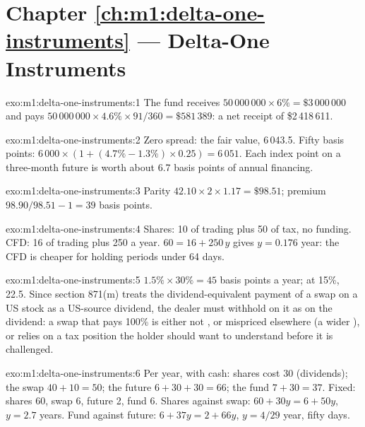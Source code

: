 \section*{Chapter \ref{ch:m1:delta-one-instruments} --- Delta-One Instruments}

\begin{solution}{exo:m1:delta-one-instruments:1}
The fund receives $50\,000\,000 \times 6\% = \$3\,000\,000$ and pays
$50\,000\,000 \times 4.6\% \times 91/360 = \$581\,389$: a net receipt of
\$2\,418\,611.
\end{solution}

\begin{solution}{exo:m1:delta-one-instruments:2}
Zero spread: the fair value, 6\,043.5. Fifty basis points: $6\,000 \times (1 +
(4.7\% - 1.3\%) \times 0.25) = 6\,051$. Each index point on a three-month
future is worth about 6.7 basis points of annual financing.
\end{solution}

\begin{solution}{exo:m1:delta-one-instruments:3}
Parity $42.10 \times 2 \times 1.17 = \$98.51$; premium $98.90/98.51 - 1 = 39$
basis points.
\end{solution}

\begin{solution}{exo:m1:delta-one-instruments:4}
Shares: 10 of trading plus 50 of tax, no funding. CFD: 16 of trading plus 250
a year. $60 = 16 + 250\,y$ gives $y = 0.176$ year: the CFD is cheaper for
holding periods under 64 days.
\end{solution}

\begin{solution}{exo:m1:delta-one-instruments:5}
$1.5\% \times 30\% = 45$ basis points a year; at 15\%, 22.5. Since section
871(m) treats the dividend-equivalent payment of a  swap on a US
stock as a US-source dividend, the dealer must withhold on it as on the
dividend: a swap that pays 100\% is either not , or mispriced
elsewhere (a wider ), or relies on a tax position the holder
should want to understand before it is challenged.
\end{solution}

\begin{solution}{exo:m1:delta-one-instruments:6}
Per year, with cash: shares cost 30 (dividends); the swap $40 + 10 = 50$; the
future $6 + 30 + 30 = 66$; the fund $7 + 30 = 37$. Fixed: shares 60, swap 6,
future 2, fund 6. Shares against swap: $60 + 30y = 6 + 50y$, $y = 2.7$ years.
Fund against future: $6 + 37y = 2 + 66y$, $y = 4/29$ year, fifty days.
\end{solution}

